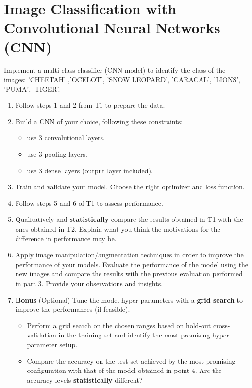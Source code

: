\documentclass[11pt]{scrartcl}
\begin{document}

\section{Image Classification with Convolutional Neural Networks (CNN)}

Implement a multi-class classifier (CNN model) to identify the class of the images: 'CHEETAH' ,'OCELOT', 'SNOW LEOPARD', 'CARACAL', 'LIONS', 'PUMA', 'TIGER'.

\begin{enumerate}
\item Follow steps 1 and 2 from T1 to prepare the data.
\item Build a CNN of your choice, following these constraints: 
\begin{itemize}
\item use 3 convolutional layers.
\item use 3 pooling layers.
\item use 3 dense layers (output layer included).
\end{itemize}
\item Train and validate your model. Choose the right optimizer and loss function. 
\item Follow steps 5 and 6 of T1 to assess performance.
\item Qualitatively and \textbf{statistically} compare the results obtained in T1 with the ones obtained in T2. Explain what you think the motivations for the difference in performance may be.
\item Apply image manipulation/augmentation techniques in order to improve the performance of your models. Evaluate the performance of the model using the new images and compare the results with the previous evaluation performed in part 3. Provide your observations and insights.
\item \textbf{Bonus} (Optional) Tune the model hyper-parameters with a \textbf{grid search} to improve the performances (if feasible).
\begin{itemize}
\item Perform a grid search on the chosen ranges based on hold-out cross-validation in the training set and identify the most promising hyper-parameter setup.
\item Compare the accuracy on the test set achieved by the most promising configuration with that of the model obtained in point 4. Are the accuracy levels \textbf{statistically} different?
\end{itemize}
\end{enumerate}
\end{document}
